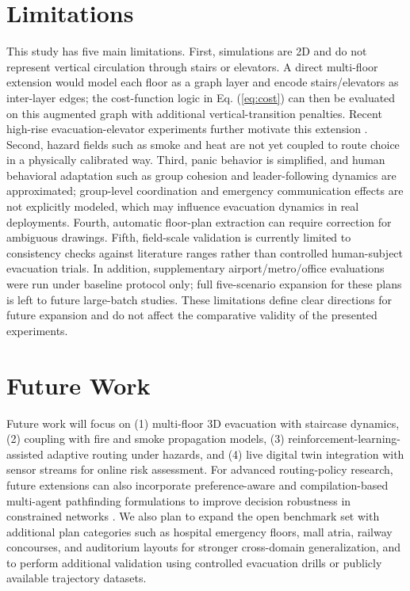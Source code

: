 \documentclass[journal]{IEEEtran}
\begin{document}
\section{Limitations}
This study has five main limitations. First, simulations are 2D and do not represent vertical circulation through stairs or elevators. A direct multi-floor extension would model each floor as a graph layer and encode stairs/elevators as inter-layer edges; the cost-function logic in Eq. (\ref{eq:cost}) can then be evaluated on this augmented graph with additional vertical-transition penalties. Recent high-rise evacuation-elevator experiments further motivate this extension \cite{mossberg2020elevator}. Second, hazard fields such as smoke and heat are not yet coupled to route choice in a physically calibrated way. Third, panic behavior is simplified, and human behavioral adaptation such as group cohesion and leader-following dynamics are approximated; group-level coordination and emergency communication effects are not explicitly modeled, which may influence evacuation dynamics in real deployments. Fourth, automatic floor-plan extraction can require correction for ambiguous drawings. Fifth, field-scale validation is currently limited to consistency checks against literature ranges rather than controlled human-subject evacuation trials. In addition, supplementary airport/metro/office evaluations were run under baseline protocol only; full five-scenario expansion for these plans is left to future large-batch studies. These limitations define clear directions for future expansion and do not affect the comparative validity of the presented experiments.

\section{Future Work}
Future work will focus on (1) multi-floor 3D evacuation with staircase dynamics, (2) coupling with fire and smoke propagation models, (3) reinforcement-learning-assisted adaptive routing under hazards, and (4) live digital twin integration with sensor streams for online risk assessment. For advanced routing-policy research, future extensions can also incorporate preference-aware and compilation-based multi-agent pathfinding formulations to improve decision robustness in constrained networks \cite{ho2022mapfpref,surynek2022mapfsurvey}. We also plan to expand the open benchmark set with additional plan categories such as hospital emergency floors, mall atria, railway concourses, and auditorium layouts for stronger cross-domain generalization, and to perform additional validation using controlled evacuation drills or publicly available trajectory datasets.
\end{document}
